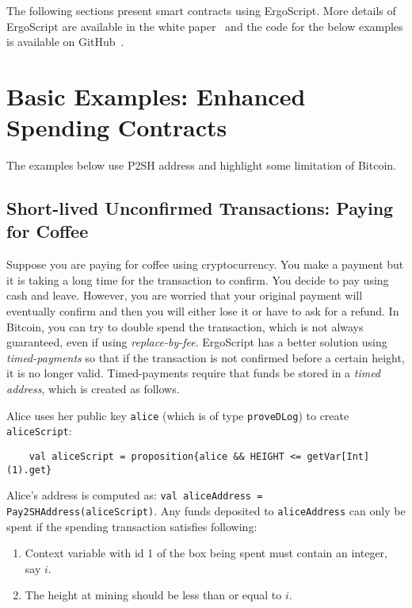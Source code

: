 \documentclass[11pt]{article}
\newcommand{\langname}{ErgoScript\xspace}
\begin{document}
The following sections present smart contracts using \langname. More details of \langname are available in the white paper~\cite{whitepaper} and the code for the below examples is available on GitHub~\cite{langrepo}. 
\section{Basic Examples: Enhanced Spending Contracts}

The examples below use P2SH address and highlight some limitation of Bitcoin. 

\subsection{Short-lived Unconfirmed Transactions: Paying for Coffee}

Suppose you are paying for coffee using cryptocurrency. You make a payment but it is taking a long time for the transaction to confirm. You decide to pay using cash and leave. However, you are worried that your original payment will eventually confirm and then you will either lose it or have to ask for a refund. In Bitcoin, you can try to double spend the transaction, which is not always guaranteed, even if using {\em replace-by-fee}. \langname has a better solution using {\em timed-payments} so that if the transaction is not confirmed before a certain height, it is no longer valid. Timed-payments require that funds be stored in a {\em timed address}, which is created as follows. 

Alice uses her public key \texttt{alice} (which is of type \texttt{proveDLog}) to create \texttt{aliceScript}:
\begin{verbatim}
	val aliceScript = proposition{alice && HEIGHT <= getVar[Int](1).get}
\end{verbatim}

Alice's address is computed as: \texttt{val aliceAddress = Pay2SHAddress(aliceScript)}. Any funds deposited to \texttt{aliceAddress} can only be spent if the spending transaction satisfies following:
\begin{enumerate}
	\item Context variable with id 1 of the box being spent must contain an integer, say $i$.
	\item The height at mining should be less than or equal to $i$. 
\end{enumerate}
\end{document}
